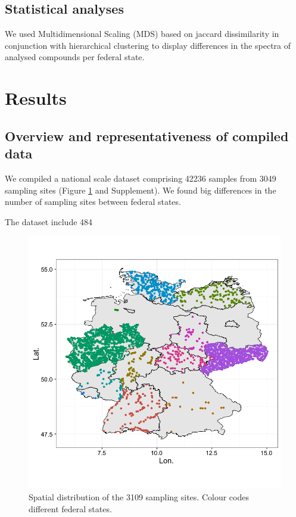 \documentclass[journal=esthag,manuscript=article]{achemso}
\begin{document}
\subsection{Statistical analyses}

We used Multidimensional Scaling (MDS) based on jaccard dissimilarity in conjunction with hierarchical clustering to display differences in the spectra of analysed compounds per federal state.




\section{Results}
\subsection{Overview and representativeness of compiled data}

We compiled a national scale dataset  comprising 42236 samples from 3049 sampling sites (Figure \ref{fig:fig1} and Supplement). 
We found big differences in the number of sampling sites between federal states.

The dataset include 484 



\begin{figure}
  \includegraphics[width=.8\textwidth]{fig/fig1.pdf}
  \caption{Spatial distribution of the 3109 sampling sites. Colour codes different federal states.}
  \label{fig:fig1}
\end{figure}
\end{document}
